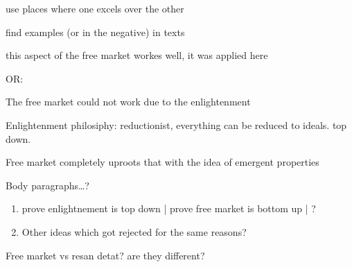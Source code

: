 \documentclass[letterpaper]{article}
\begin{document}
use places where one excels over the other

find examples (or in the negative) in texts

this aspect of the free market workes well, it was applied here

OR:

The free market could not work due to the enlightenment

Enlightenment philosiphy: reductionist, everything can be reduced to
ideals. top down.

Free market completely uproots that with the idea of emergent properties

Body paragraphs\ldots{}?

\begin{enumerate}
\item prove enlightnement is top down | prove free market is bottom up | ?
\item Other ideas which got rejected for the same reasons?
\end{enumerate}

Free market vs resan detat? are they different?
\end{document}
